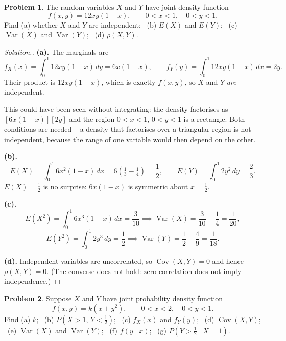 \documentclass[12pt,a4paper]{report}
\theoremstyle{definition}
\theoremstyle{plain}
\theoremstyle{definition}
\newtheorem{problemx}{Problem}[section]
\newenvironment{problem}{\begin{problemx}}{\end{problemx}}
\newenvironment{solution}
  {\renewcommand{\qedsymbol}{}\begin{proof}[\textit{Solution}.]}
  {\end{proof}}
\begin{document}
\begin{problem}
The random variables $X$ and $Y$ have joint density function
\[f(x,y) = 12xy(1-x),\qquad 0<x<1,\quad 0<y<1.\]
Find (a) whether $X$ and $Y$ are independent; \, (b) $E(X)$ and $E(Y)$; \,
(c) $\operatorname{Var}(X)$ and $\operatorname{Var}(Y)$; \, (d) $\rho(X,Y)$.
\end{problem}

\begin{solution}
\textbf{(a).} The marginals are
\[f_X(x) = \int_0^1 12xy(1-x)\,dy = 6x(1-x),\qquad
f_Y(y) = \int_0^1 12xy(1-x)\,dx = 2y.\]
Their product is $12xy(1-x)$, which is exactly $f(x,y)$, so $X$ and $Y$ \emph{are}
independent.

This could have been seen without integrating: the density factorises as
$\left[6x(1-x)\right]\left[2y\right]$ and the region $0<x<1$, $0<y<1$ is a rectangle. Both
conditions are needed -- a density that factorises over a triangular region is not
independent, because the range of one variable would then depend on the other.

\textbf{(b).}
\[E(X) = \int_0^1 6x^{2}(1-x)\,dx = 6\left(\tfrac13-\tfrac14\right) = \frac{1}{2},\qquad
E(Y) = \int_0^1 2y^{2}\,dy = \frac{2}{3}.\]
$E(X) = \tfrac12$ is no surprise: $6x(1-x)$ is symmetric about $x=\tfrac12$.

\textbf{(c).}
\[E(X^{2}) = \int_0^1 6x^{3}(1-x)\,dx = \frac{3}{10}
 \implies \operatorname{Var}(X) = \frac{3}{10}-\frac{1}{4} = \frac{1}{20},\]
\[E(Y^{2}) = \int_0^1 2y^{3}\,dy = \frac{1}{2}
 \implies \operatorname{Var}(Y) = \frac{1}{2}-\frac{4}{9} = \frac{1}{18}.\]

\textbf{(d).} Independent variables are uncorrelated, so
$\operatorname{Cov}(X,Y) = 0$ and hence $\rho(X,Y) = 0$. (The converse does not hold:
zero correlation does not imply independence.)
\end{solution}

\begin{problem}
Suppose $X$ and $Y$ have joint probability density function
\[f(x,y) = k(x+y^{2}),\qquad 0<x<2,\quad 0<y<1.\]
Find (a) $k$; \, (b) $P\left(X>1,\,Y<\tfrac12\right)$; \, (c) $f_X(x)$ and $f_Y(y)$; \,
(d) $\operatorname{Cov}(X,Y)$; \, (e) $\operatorname{Var}(X)$ and $\operatorname{Var}(Y)$;
\, (f) $f(y\mid x)$; \, (g) $P\left(Y>\tfrac12 \mid X=1\right)$.
\end{problem}
\end{document}
